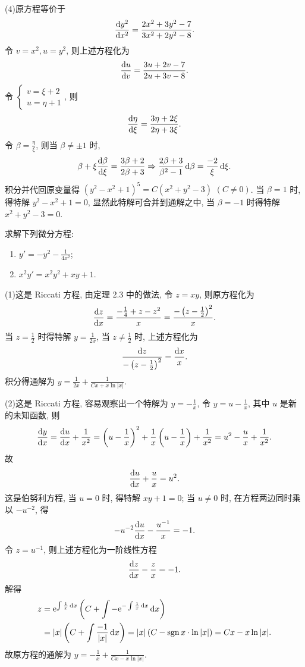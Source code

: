 \begin{solve}
  (4)原方程等价于
  \[\frac{\mathop{}\!\mathrm{d} y^2}{\mathop{}\!\mathrm{d} x^2}=\frac{2x^2+3y^2-7}{3x^2+2y^2-8}.\]
  令 $v=x^2,u=y^2$, 则上述方程化为
  \[\frac{\mathop{}\!\mathrm{d} u}{\mathop{}\!\mathrm{d} v}=\frac{3u+2v-7}{2u+3v-8}.\]
  令 $\begin{cases}v=\xi+2\\u=\eta+1\end{cases}$, 则
  \[\frac{\mathop{}\!\mathrm{d}\eta}{\mathop{}\!\mathrm{d}\xi}=\frac{3\eta+2\xi}{2\eta+3\xi}.\]
  令 $\beta=\frac{\eta}{\xi}$, 则当 $\beta\neq\pm 1$ 时,
  \[\beta+\xi\frac{\mathop{}\!\mathrm{d}\beta}{\mathop{}\!\mathrm{d}\xi} = \frac{3\beta+2}{2\beta+3}
    \Rightarrow\frac{2\beta+3}{\beta^2-1}\mathop{}\!\mathrm{d}\beta=\frac{-2}{\xi}\mathop{}\!\mathrm{d}\xi.\]
  积分并代回原变量得 $(y^2-x^2+1)^5=C(x^2+y^2-3)$ $(C\neq 0)$.
  当 $\beta=1$ 时, 得特解 $y^2-x^2+1=0$, 显然此特解可合并到通解之中, 当 $\beta=-1$ 时得特解 $x^2+y^2-3=0$.
\end{solve}



\begin{exercise}
  求解下列微分方程:
  \begin{enumerate}[(1)]
  \item $\displaystyle y'=-y^2-\frac{1}{4x^2}$;
  \item $\displaystyle x^2y'=x^2y^2+xy+1$.
  \end{enumerate}
\end{exercise}

\begin{solve}
  (1)这是 Riccati 方程, 由定理 2.3 中的做法, 令 $z=xy$, 则原方程化为
  \[\frac{\mathop{}\!\mathrm{d} z}{\mathop{}\!\mathrm{d} x}=\frac{-\frac{1}{4}+z-z^2}{x}=\frac{-\left(z-\frac{1}{2}\right)^2}{x}.\]
  当 $z=\frac{1}{2}$ 时得特解 $y=\frac{1}{2x}$, 当 $z\neq\frac{1}{2}$ 时, 上述方程化为
  \[\frac{\mathop{}\!\mathrm{d} z}{-\left(z-\frac{1}{2}\right)^2}=\frac{\mathop{}\!\mathrm{d} x}{x}.\]
  积分得通解为 $y=\frac{1}{2x}+\frac{1}{Cx+x\ln|x|}$.

  (2)这是 Riccati 方程, 容易观察出一个特解为 $y=-\frac{1}{x}$,
  令 $y=u-\frac{1}{x}$, 其中 $u$ 是新的未知函数, 则
  \[\frac{\mathop{}\!\mathrm{d} y}{\mathop{}\!\mathrm{d} x}=\frac{\mathop{}\!\mathrm{d} u}{\mathop{}\!\mathrm{d} x}+\frac{1}{x^2}
    = \left(u-\frac{1}{x}\right)^2+\frac{1}{x}\left(u-\frac{1}{x}\right)+\frac{1}{x^2}
    = u^2-\frac{u}{x}+\frac{1}{x^2}.\]
  故
  \[\frac{\mathop{}\!\mathrm{d} u}{\mathop{}\!\mathrm{d} x}+\frac{u}{x} = u^2.\]
  这是伯努利方程, 当 $u=0$ 时, 得特解 $xy+1=0$; 当 $u\neq 0$ 时, 在方程两边同时乘以 $-u^{-2}$, 得
  \[-u^{-2}\frac{\mathop{}\!\mathrm{d} u}{\mathop{}\!\mathrm{d} x}-\frac{u^{-1}}{x}=-1.\]
  令 $z=u^{-1}$, 则上述方程化为一阶线性方程
  \[\frac{\mathop{}\!\mathrm{d} z}{\mathop{}\!\mathrm{d} x}-\frac{z}{x} = -1.\]
  解得
  \begin{align*}
    z & = \mathrm{e}^{\int\frac{1}{x}\mathop{}\!\mathrm{d} x}\left(C+\int-\mathrm{e}^{-\int\frac{1}{x}\mathop{}\!\mathrm{d} x}\mathop{}\!\mathrm{d} x\right)\\
      & = |x|\left(C+\int\frac{-1}{|x|}\mathop{}\!\mathrm{d} x\right)=|x|\left(C-\operatorname{sgn} x\cdot\ln|x|\right)=Cx-x\ln|x|.
  \end{align*}
  故原方程的通解为 $y=-\frac{1}{x}+\frac{1}{Cx-x\ln|x|}$.
\end{solve}



